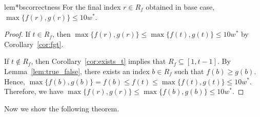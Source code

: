 \documentclass[10pt,a4paper]{article}
\theoremstyle{star}
\theoremstyle{claimstar}
\begin{document}
\begin{restatable}{lem*}{bscorrectness}
    \label{lem:bs_correctness}
    For the final index  $r\in R_f$ obtained in base case, $\max \{ f(r), g(r) \} \le 10 w^*$. 
\end{restatable}


\begin{proof}
    If $t \in R_f$, then $\max \{ f(r), g(r) \} \le \max \{ f(t), g(t) \} \le 10 w^*$ by Corollary~\ref{cor:fgt}.  

    If $t \notin R_f$, then Corollary~\ref{cor:exists_t} implies that $R_f \subseteq [1, t-1]$.  
    By Lemma~\ref{lem:true_false}, there exists an index $b \in R_f$ such that $f(b) \ge g(b)$.  
    Hence, $\max \{ f(b), g(b) \} = f(b) \le f(t) \le \max \{ f(t), g(t) \} \le 10 w^*$.  
    Therefore, we have $\max \{ f(r), g(r) \} \le \max \{ f(b), g(b) \} \le 10 w^*$.
\end{proof}

Now we show the following theorem.

\tenapx*
\end{document}

